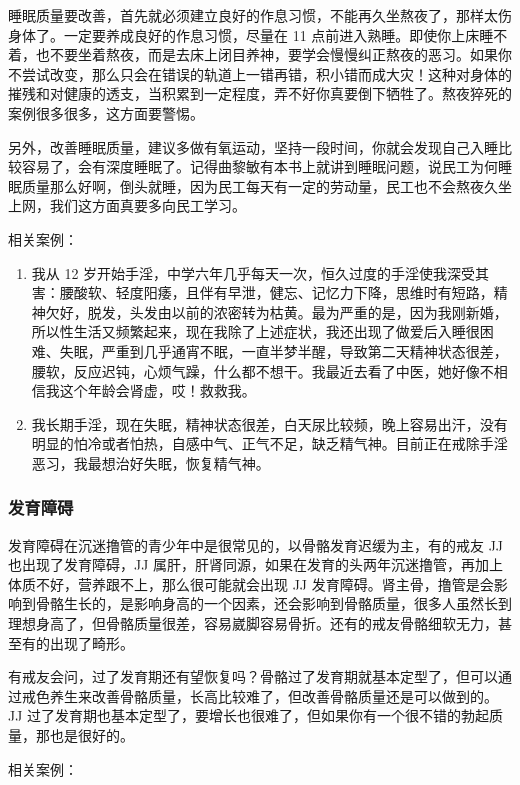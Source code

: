 \documentclass{ctexart}
\begin{document}
睡眠质量要改善，首先就必须建立良好的作息习惯，不能再久坐熬夜了，那样太伤身体了。一定要养成良好的作息习惯，尽量在 11 点前进入熟睡。即使你上床睡不着，也不要坐着熬夜，而是去床上闭目养神，要学会慢慢纠正熬夜的恶习。如果你不尝试改变，那么只会在错误的轨道上一错再错，积小错而成大灾！这种对身体的摧残和对健康的透支，当积累到一定程度，弄不好你真要倒下牺牲了。熬夜猝死的案例很多很多，这方面要警惕。

另外，改善睡眠质量，建议多做有氧运动，坚持一段时间，你就会发现自己入睡比较容易了，会有深度睡眠了。记得曲黎敏有本书上就讲到睡眠问题，说民工为何睡眠质量那么好啊，倒头就睡，因为民工每天有一定的劳动量，民工也不会熬夜久坐上网，我们这方面真要多向民工学习。

相关案例：

\begin{enumerate}
    \item 我从 12 岁开始手淫，中学六年几乎每天一次，恒久过度的手淫使我深受其害：腰酸软、轻度阳痿，且伴有早泄，健忘、记忆力下降，思维时有短路，精神欠好，脱发，头发由以前的浓密转为枯黄。最为严重的是，因为我刚新婚，所以性生活又频繁起来，现在我除了上述症状，我还出现了做爱后入睡很困难、失眠，严重到几乎通宵不眠，一直半梦半醒，导致第二天精神状态很差，腰软，反应迟钝，心烦气躁，什么都不想干。我最近去看了中医，她好像不相信我这个年龄会肾虚，哎！救救我。
    \item 我长期手淫，现在失眠，精神状态很差，白天尿比较频，晚上容易出汗，没有明显的怕冷或者怕热，自感中气、正气不足，缺乏精气神。目前正在戒除手淫恶习，我最想治好失眠，恢复精气神。
\end{enumerate}

\subsubsection{发育障碍}

发育障碍在沉迷撸管的青少年中是很常见的，以骨骼发育迟缓为主，有的戒友 JJ 也出现了发育障碍，JJ 属肝，肝肾同源，如果在发育的头两年沉迷撸管，再加上体质不好，营养跟不上，那么很可能就会出现 JJ 发育障碍。肾主骨，撸管是会影响到骨骼生长的，是影响身高的一个因素，还会影响到骨骼质量，很多人虽然长到理想身高了，但骨骼质量很差，容易崴脚容易骨折。还有的戒友骨骼细软无力，甚至有的出现了畸形。

有戒友会问，过了发育期还有望恢复吗？骨骼过了发育期就基本定型了，但可以通过戒色养生来改善骨骼质量，长高比较难了，但改善骨骼质量还是可以做到的。JJ 过了发育期也基本定型了，要增长也很难了，但如果你有一个很不错的勃起质量，那也是很好的。

相关案例：
\end{document}
